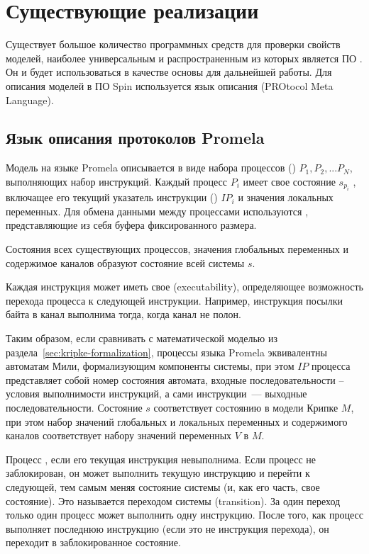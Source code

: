 
\section{Существующие реализации }
\label{sec:analogues}

Существует большое количество программных средств для проверки свойств моделей, наиболее
универсальным и распространенным из которых является ПО  \cite{SpinRoot}. Он и
будет использоваться в качестве основы для дальнейшей работы. Для описания моделей в ПО
Spin используется язык описания  (PROtocol Meta Language).

\subsection{Язык описания протоколов Promela}
\label{sec:promela}

Модель на языке Promela описывается в виде набора процессов () $P_1, P_2,
... P_N$, выполняющих набор инструкций. Каждый процесс $P_i$ имеет свое состояние
$s_{p_i}$ , включащее его текущий указатель инструкции () $IP_i$
и значения локальных переменных. Для обмена данными между процессами используются
, представляющие из себя буфера фиксированного размера.

Состояния всех существующих процессов, значения глобальных переменных и содержимое каналов
образуют состояние всей системы $s$.

Каждая инструкция может иметь свое  (executability),
определяющее возможность перехода процесса к следующей инструкции. Например, инструкция
посылки байта в канал выполнима тогда, когда канал не полон.

Таким образом, если сравнивать с математической моделью из
раздела~\ref{sec:kripke-formalization}, процессы языка Promela эквивалентны автоматам
Мили, формализующим компоненты системы, при этом $IP$ процесса представляет собой номер
состояния автомата, входные последовательности -- условия выполнимости инструкций, а сами
инструкции~--- выходные последовательности. Состояние $s$ соответствует состоянию в модели
Крипке $M$, при этом набор значений глобальных и локальных переменных и содержимого
каналов соответствует набору значений переменных $V$ в $M$.

Процесс , если его текущая инструкция невыполнима. Если процесс не
заблокирован, он может выполнить текущую инструкцию и перейти к следующей, тем самым меняя
состояние системы (и, как его часть, свое состояние). Это называется переходом системы
(transition). За один переход только один процесс может выполнить одну инструкцию. После
того, как процесс выполняет последнюю инструкцию (если это не инструкция перехода), он
переходит в заблокированное состояние.

